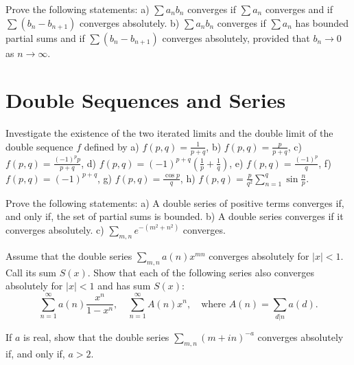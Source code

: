     \begin{problembox}
    Prove the following statements:
    a) \(\sum a_n b_n\) converges if \(\sum a_n\) converges and if \(\sum (b_n - b_{n+1})\) converges absolutely.
    b) \(\sum a_n b_n\) converges if \(\sum a_n\) has bounded partial sums and if \(\sum (b_n - b_{n+1})\) converges absolutely, provided that \(b_n \to 0\) as \(n \to \infty\).
    \end{problembox}

\section{Double Sequences and Series}

\begin{problembox}
    Investigate the existence of the two iterated limits and the double limit of the double sequence \(f\) defined by
    a) \( f(p, q) = \frac{1}{p + q}\), b) \( f(p, q) = \frac{p}{p + q}\),
    c) \( f(p, q) = \frac{(-1)^p p}{p + q}\), d) \( f(p, q) = (-1)^{p+q} \left( \frac{1}{p} + \frac{1}{q} \right)\),
    e) \( f(p, q) = \frac{(-1)^p}{q}\), f) \( f(p, q) = (-1)^{p+q}\),
    g) \( f(p, q) = \frac{\cos p}{q}\), h) \( f(p, q) = \frac{p}{q^2} \sum_{n=1}^{q} \sin \frac{n}{p}\).
    \end{problembox}
    
    \begin{problembox}
    Prove the following statements:
    a) A double series of positive terms converges if, and only if, the set of partial sums is bounded.
    b) A double series converges if it converges absolutely.
    c) \(\sum_{m,n} e^{-(m^2+n^2)}\) converges.
    \end{problembox}
    
    \begin{problembox}
    Assume that the double series \(\sum_{m,n} a(n)x^{mn}\) converges absolutely for \(|x| < 1\). Call its sum \(S(x)\). Show that each of the following series also converges absolutely for \(|x| < 1\) and has sum \(S(x)\):
    \[\sum_{n=1}^{\infty} a(n) \frac{x^n}{1 - x^n}, \quad \sum_{n=1}^{\infty} A(n)x^n, \quad \text{where } A(n) = \sum_{d|n} a(d).\]
    \end{problembox}
    
    \begin{problembox}
    If \(a\) is real, show that the double series \(\sum_{m,n} (m + i n)^{-a}\) converges absolutely if, and only if, \(a > 2\).
    \end{problembox}

